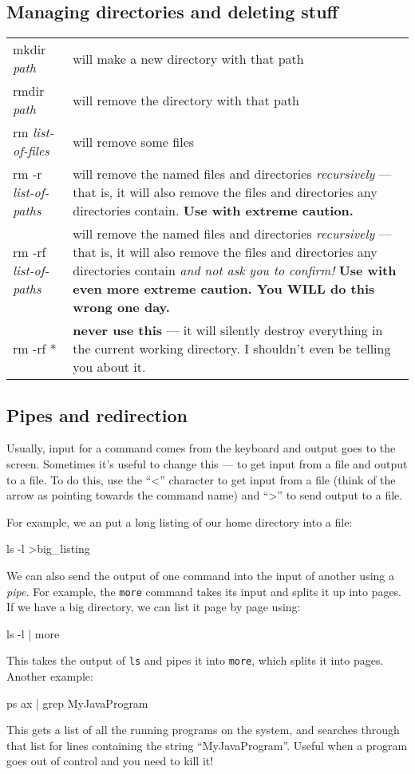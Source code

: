 \documentclass[twocolumn]{article}
\begin{document}
\subsection{Managing directories and deleting stuff}
\begin{tabular}{l|p{2in}}
mkdir \emph{path} & will make a new directory with that path\\
rmdir \emph{path} & will remove the directory with that path\\
rm \emph{list-of-files} & will remove some files\\
rm -r \emph{list-of-paths} & will remove the named files and directories
\emph{recursively} --- that is, it will also remove the files and directories
any directories contain. \textbf{Use with extreme caution.} \\
rm -rf \emph{list-of-paths} & will remove the named files and directories
\emph{recursively} --- that is, it will also remove the files and directories
any directories contain \emph{and not ask you to confirm!}
\textbf{Use with even more extreme caution. You WILL do this wrong one day.}\\
rm -rf * & \textbf{never use this} --- it will silently destroy everything
in the current working directory. I shouldn't even be telling you about it.
\end{tabular}

\subsection{Pipes and redirection}
Usually, input for a command comes from the keyboard and output goes
to the screen. Sometimes it's useful to change this --- to get input
from a file and output to a file. To do this, use the ``\textless'' character
to get input from a file (think of the arrow as pointing towards the command
name) and ``\textgreater'' to send output to a file.

For example, we an put a long listing of our home directory into a file:
\begin{v}
ls -l >big_listing
\end{v}

We can also send the output of one command into the input of another using
a \emph{pipe.} For example, the \verb+more+ command takes its input and
splits it up into pages. If we have a big directory, we can list it
page by page using:
\begin{v}
ls -l | more
\end{v}
This takes the output of \texttt{ls} and pipes it into \texttt{more}, which
splits it into pages. Another example:
\begin{v}
ps ax | grep MyJavaProgram
\end{v}
This gets a list of all the running programs on the system, and searches
through that list for lines containing the string ``MyJavaProgram''.
Useful when a program goes out of control and you need to kill it!
\end{document}
